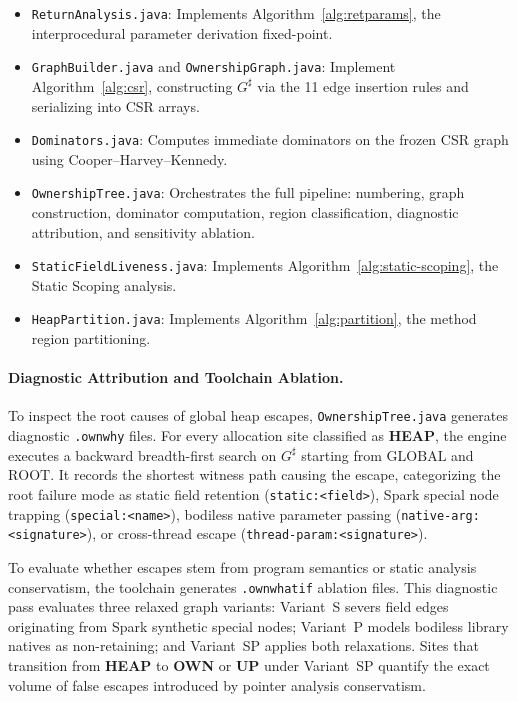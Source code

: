 \documentclass[12pt,a4paper]{article}
\newcommand{\OWN}{\textbf{OWN}}
\newcommand{\UP}{\textbf{UP}}
\newcommand{\HEAP}{\textbf{HEAP}}
\newcommand{\GLOBAL}{\text{GLOBAL}}
\newcommand{\ROOT}{\text{ROOT}}
\begin{document}
\begin{itemize}
  \item \texttt{ReturnAnalysis.java}: Implements Algorithm~\ref{alg:retparams}, the interprocedural parameter derivation fixed-point.
  \item \texttt{GraphBuilder.java} and \texttt{OwnershipGraph.java}: Implement Algorithm~\ref{alg:csr}, constructing $G^\sharp$ via the 11 edge insertion rules and serializing into CSR arrays.
  \item \texttt{Dominators.java}: Computes immediate dominators on the frozen CSR graph using Cooper--Harvey--Kennedy.
  \item \texttt{OwnershipTree.java}: Orchestrates the full pipeline: numbering, graph construction, dominator computation, region classification, diagnostic attribution, and sensitivity ablation.
  \item \texttt{StaticFieldLiveness.java}: Implements Algorithm~\ref{alg:static-scoping}, the Static Scoping analysis.
  \item \texttt{HeapPartition.java}: Implements Algorithm~\ref{alg:partition}, the method region partitioning.
\end{itemize}

\paragraph{Diagnostic Attribution and Toolchain Ablation.}
To inspect the root causes of global heap escapes, \texttt{OwnershipTree.java} generates diagnostic \texttt{.ownwhy} files. For every allocation site classified as \HEAP{}, the engine executes a backward breadth-first search on $G^\sharp$ starting from $\GLOBAL$ and $\ROOT$. It records the shortest witness path causing the escape, categorizing the root failure mode as static field retention (\texttt{static:<field>}), Spark special node trapping (\texttt{special:<name>}), bodiless native parameter passing (\texttt{native-arg:<signature>}), or cross-thread escape (\texttt{thread-param:<signature>}).

To evaluate whether escapes stem from program semantics or static analysis conservatism, the toolchain generates \texttt{.ownwhatif} ablation files. This diagnostic pass evaluates three relaxed graph variants: Variant~S severs field edges originating from Spark synthetic special nodes; Variant~P models bodiless library natives as non-retaining; and Variant~SP applies both relaxations. Sites that transition from \HEAP{} to \OWN{} or \UP{} under Variant~SP quantify the exact volume of false escapes introduced by pointer analysis conservatism.
\end{document}
